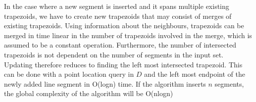 In the case where a new segment is inserted and it spans multiple existing trapezoids, we have to create new trapezoids that may consist of merges of existing trapezoids. Using information about the neighbours, trapezoids can be merged in time linear in the number of trapezoids involved in the merge, which is assumed to be a constant operation. Furthermore,  the number of intersected trapezoids is not dependent on the number of segments in the input set. Updating therefore reduces to finding the left most intersected trapezoid. This can be done with a point location query in $D$ and the left most endpoint of the newly added line segment in O(logn) time. If the algorithm inserts $n$ segments, the global complexity of the algorithm will be O(nlogn)
